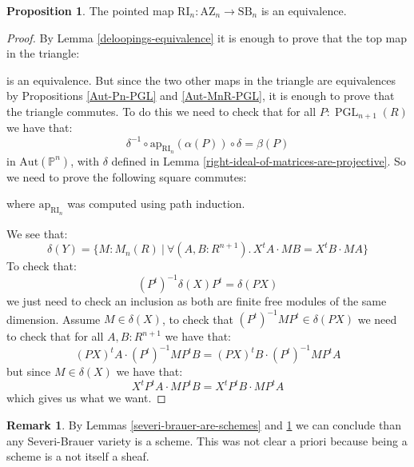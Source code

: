 \documentclass[10pt,a4paper]{article}
\theoremstyle{definition}
\newtheorem{remark}[theorem]{Remark}
\newtheorem{proposition}[theorem]{Proposition}
\DeclareMathOperator{\PGL}{PGL}
\newcommand{\SB}{\mathrm{SB}}
\newcommand{\RI}{\mathrm{RI}}
\newcommand{\AZ}{\mathrm{AZ}}
\newcommand{\bP}{\mathbb{P}}
\newcommand{\Aut}{\mathrm{Aut}}
\begin{document}
\begin{proposition}\label{right-ideal-is-equivalence}
The pointed map $\RI_n:\AZ_n\to\SB_n$ is an equivalence.
\end{proposition}

\begin{proof}
By Lemma \ref{deloopings-equivalence} it is enough to prove that the top map in the triangle:
\begin{center}
\end{center}
is an equivalence. But since the two other maps in the triangle are equivalences by Propositions \ref{Aut-Pn-PGL} and \ref{Aut-MnR-PGL}, it is enough to prove that the triangle commutes. To do this we need to check that for all $P:\PGL_{n+1}(R)$ we have that:
\[\delta^{-1}\circ \mathrm{ap}_{\RI_n}(\alpha(P))\circ\delta = \beta(P)\]
in $\Aut(\bP^n)$, with $\delta$ defined in Lemma \ref{right-ideal-of-matrices-are-projective}. So we need to prove the following square commutes:
\begin{center}
\end{center}
where $\mathrm{ap}_{\RI_n}$ was computed using path induction.

We see that:
\[\delta(Y) = \{M:M_n(R)\ |\ \forall (A,B:R^{n+1}).\, X^tA\cdot MB = X^tB\cdot MA\}\]
To check that:
\[(P^t)^{-1}\delta(X)P^t = \delta(PX)\]
we just need to check an inclusion as both are finite free modules of the same dimension. Assume $M\in\delta(X)$, to check that $(P^t)^{-1}MP^t\in\delta(PX)$ we need to check that for all $A,B:R^{n+1}$ we have that:
\[(PX)^tA \cdot (P^t)^{-1}MP^tB = (PX)^tB \cdot (P^t)^{-1}MP^tA \]
but since $M\in\delta(X)$ we have that:
\[X^tP^tA \cdot MP^tB = X^tP^tB\cdot MP^tA \]
which gives us what we want.
\end{proof}

\begin{remark}
By Lemmas \ref{severi-brauer-are-schemes} and \ref{right-ideal-is-equivalence} we can conclude than any Severi-Brauer variety is a scheme. This was not clear a priori because being a scheme is a not itself a sheaf.
\end{remark}
\end{document}
